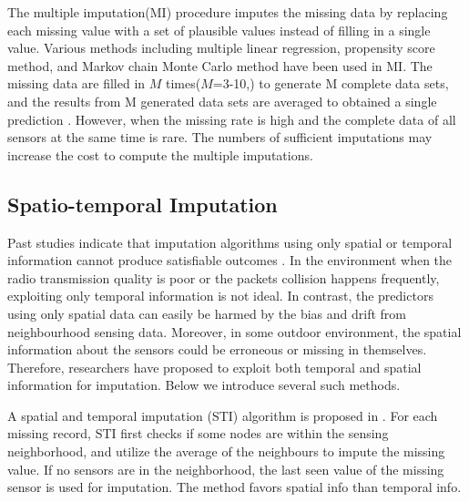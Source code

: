 The multiple imputation(MI) procedure\cite{yuan2000multiple} imputes the missing data by replacing each missing value with a set of plausible values instead of filling in a single value. Various methods including multiple linear regression, propensity score method, and Markov chain Monte Carlo method have been used in MI. The missing data are filled in $M$ times($M$=3-10,\cite{Little:hotdeck}) to generate M complete data sets, and the results from M generated data sets are averaged to obtained a single prediction \cite{yuan2000multiple}. 
However, when the missing rate is high and the complete data of all sensors at the same time is rare. The numbers of sufficient imputations may increase the cost to compute the multiple imputations. 



\subsection{Spatio-temporal Imputation}    
Past studies indicate that imputation algorithms using only spatial or temporal information cannot produce satisfiable outcomes \cite{Lim:robust}. In the environment when the radio transmission quality is poor or the packets collision happens frequently, exploiting only temporal information is not ideal. In contrast, the predictors using only spatial data can easily be harmed by the bias and drift from neighbourhood sensing data. Moreover, in some outdoor environment, the spatial information about the sensors could be erroneous or missing in themselves. Therefore, researchers have proposed to exploit both temporal and spatial information for imputation.
Below we introduce several such methods.   

A spatial and temporal imputation (STI) algorithm is proposed in \cite{li2008spatial}. 
For each missing record, STI first checks if some nodes are within the sensing neighborhood, and utilize 
the average of the neighbours to impute the missing value. If no sensors are in the neighborhood, the last seen value of the missing sensor is used for imputation. The method favors spatial info than temporal info. 

